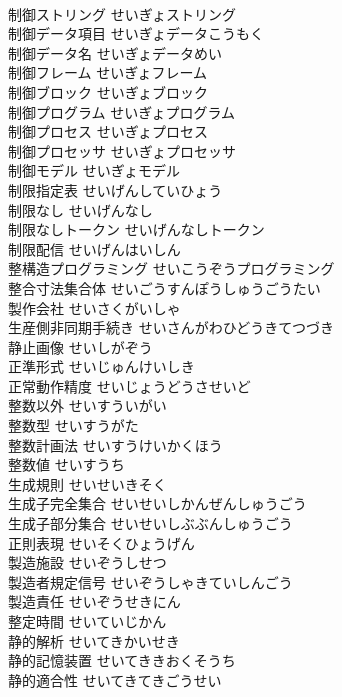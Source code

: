 \documentclass[8pt]{extreport}
\begin{document}
\begin{CJK}{UTF8}{min}
\\	制御ストリング	せいぎょストリング	
\\	制御データ項目	せいぎょデータこうもく	
\\	制御データ名	せいぎょデータめい	
\\	制御フレーム	せいぎょフレーム	
\\	制御ブロック	せいぎょブロック	
\\	制御プログラム	せいぎょプログラム	
\\	制御プロセス	せいぎょプロセス	
\\	制御プロセッサ	せいぎょプロセッサ	
\\	制御モデル	せいぎょモデル	
\\	制限指定表	せいげんしていひょう	
\\	制限なし	せいげんなし	
\\	制限なしトークン	せいげんなしトークン	
\\	制限配信	せいげんはいしん	
\\	整構造プログラミング	せいこうぞうプログラミング	
\\	整合寸法集合体	せいごうすんぽうしゅうごうたい	
\\	製作会社	せいさくがいしゃ	
\\	生産側非同期手続き	せいさんがわひどうきてつづき	
\\	静止画像	せいしがぞう	
\\	正準形式	せいじゅんけいしき	
\\	正常動作精度	せいじょうどうさせいど	
\\	整数以外	せいすういがい	
\\	整数型	せいすうがた	
\\	整数計画法	せいすうけいかくほう	
\\	整数値	せいすうち	
\\	生成規則	せいせいきそく	
\\	生成子完全集合	せいせいしかんぜんしゅうごう	
\\	生成子部分集合	せいせいしぶぶんしゅうごう	
\\	正則表現	せいそくひょうげん	
\\	製造施設	せいぞうしせつ	
\\	製造者規定信号	せいぞうしゃきていしんごう	
\\	製造責任	せいぞうせきにん	
\\	整定時間	せいていじかん	
\\	静的解析	せいてきかいせき	
\\	静的記憶装置	せいてききおくそうち	
\\	静的適合性	せいてきてきごうせい	

\end{CJK}
\end{document}
